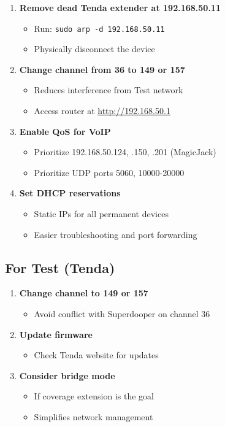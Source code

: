 \documentclass[11pt,letterpaper]{article}
\begin{document}
\begin{enumerate}
    \item \textbf{Remove dead Tenda extender at 192.168.50.11}
    \begin{itemize}
        \item Run: \texttt{sudo arp -d 192.168.50.11}
        \item Physically disconnect the device
    \end{itemize}

    \item \textbf{Change channel from 36 to 149 or 157}
    \begin{itemize}
        \item Reduces interference from Test network
        \item Access router at \url{http://192.168.50.1}
    \end{itemize}

    \item \textbf{Enable QoS for VoIP}
    \begin{itemize}
        \item Prioritize 192.168.50.124, .150, .201 (MagicJack)
        \item Prioritize UDP ports 5060, 10000-20000
    \end{itemize}

    \item \textbf{Set DHCP reservations}
    \begin{itemize}
        \item Static IPs for all permanent devices
        \item Easier troubleshooting and port forwarding
    \end{itemize}
\end{enumerate}

\subsection{For Test (Tenda)}

\begin{enumerate}
    \item \textbf{Change channel to 149 or 157}
    \begin{itemize}
        \item Avoid conflict with Superdooper on channel 36
    \end{itemize}

    \item \textbf{Update firmware}
    \begin{itemize}
        \item Check Tenda website for updates
    \end{itemize}

    \item \textbf{Consider bridge mode}
    \begin{itemize}
        \item If coverage extension is the goal
        \item Simplifies network management
    \end{itemize}
\end{enumerate}
\end{document}
